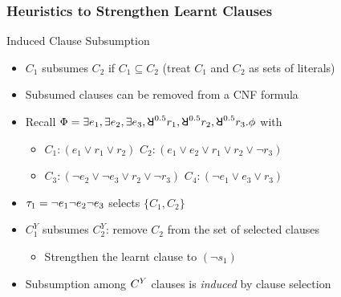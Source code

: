 \begin{frame}
    \frametitle{Heuristics to Strengthen Learnt Clauses}
    \begin{block}{Induced Clause Subsumption}
        \begin{itemize}
            \item $C_1$ subsumes $C_2$ if $C_1 \subseteq C_2$ (treat $C_1$ and $C_2$ as sets of literals)
                  \pause
            \item Subsumed clauses can be removed from a CNF formula
                  \pause
            \item Recall $\Qf=\exists e_1,\exists e_2,\exists e_3,\random{0.5} r_1,\random{0.5} r_2,\random{0.5} r_3.\pf$ with
                  \begin{itemize}
                      \item[] $C_1: (e_1 \lor r_1 \lor r_2)$ $C_2: (e_1 \lor e_2 \lor r_1 \lor r_2 \lor \lnot r_3)$
                      \item[] $C_3: (\lnot e_2 \lor \lnot e_3 \lor r_2 \lor \lnot r_3)$ $C_4: (\lnot e_1 \lor e_3 \lor r_3)$
                  \end{itemize}
                  \pause
            \item $\tau_1=\lnot e_1 \lnot e_2 \lnot e_3$ selects $\{C_1,C_2\}$
                  \pause
            \item $C_1^Y$ subsumes $C_2^Y$: remove $C_2$ from the set of selected clauses
                  \pause
                  \begin{itemize}
                      \item Strengthen the learnt clause to $(\lnot s_1)$
                            \pause
                  \end{itemize}
            \item Subsumption among $C^Y$ clauses is \textit{induced} by clause selection
        \end{itemize}
    \end{block}
\end{frame}

